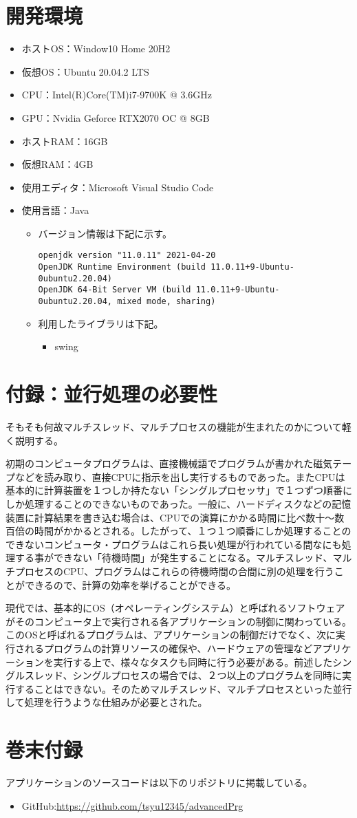 \documentclass[dvipdfmx, titlepage]{jsarticle}
\begin{document}
\section{開発環境}
\begin{itemize}
  \item ホストOS：Window10 Home 20H2
  \item 仮想OS：Ubuntu 20.04.2 LTS
  \item CPU：Intel(R)Core(TM)i7-9700K @ 3.6GHz
  \item GPU：Nvidia Geforce RTX2070 OC @ 8GB
  \item ホストRAM：16GB
  \item 仮想RAM：4GB
  \item 使用エディタ：Microsoft Visual Studio Code
  \item 使用言語：Java
  \begin{itemize}
    \item バージョン情報は下記に示す。
    \begin{verbatim}
openjdk version "11.0.11" 2021-04-20
OpenJDK Runtime Environment (build 11.0.11+9-Ubuntu-0ubuntu2.20.04)
OpenJDK 64-Bit Server VM (build 11.0.11+9-Ubuntu-0ubuntu2.20.04, mixed mode, sharing)
    \end{verbatim}
    \item 利用したライブラリは下記。
    \begin{itemize}
      \item swing
    \end{itemize}
  \end{itemize}
\end{itemize}
\section{付録：並行処理の必要性}
そもそも何故マルチスレッド、マルチプロセスの機能が生まれたのかについて軽く説明する。\par
初期のコンピュータプログラムは、直接機械語でプログラムが書かれた磁気テープなどを読み取り、直接CPUに指示を出し実行するものであった。またCPUは基本的に計算装置を１つしか持たない「シングルプロセッサ」で１つずつ順番にしか処理することのできないものであった。一般に、ハードディスクなどの記憶装置に計算結果を書き込む場合は、CPUでの演算にかかる時間に比べ数十〜数百倍の時間がかかるとされる。したがって、１つ１つ順番にしか処理することのできないコンピュータ・プログラムはこれら長い処理が行われている間なにも処理する事ができない「待機時間」が発生することになる。マルチスレッド、マルチプロセスのCPU、プログラムはこれらの待機時間の合間に別の処理を行うことができるので、計算の効率を挙げることができる。\par
現代では、基本的にOS（オペレーティングシステム）と呼ばれるソフトウェアがそのコンピュータ上で実行される各アプリケーションの制御に関わっている。このOSと呼ばれるプログラムは、アプリケーションの制御だけでなく、次に実行されるプログラムの計算リソースの確保や、ハードウェアの管理などアプリケーションを実行する上で、様々なタスクも同時に行う必要がある。前述したシングルスレッド、シングルプロセスの場合では、２つ以上のプログラムを同時に実行することはできない。そのためマルチスレッド、マルチプロセスといった並行して処理を行うような仕組みが必要とされた。
\section{巻末付録}
アプリケーションのソースコードは以下のリポジトリに掲載している。
\begin{itemize}
  \item GitHub:\url{https://github.com/tsyu12345/advancedPrg}
\end{itemize}
\end{document}
